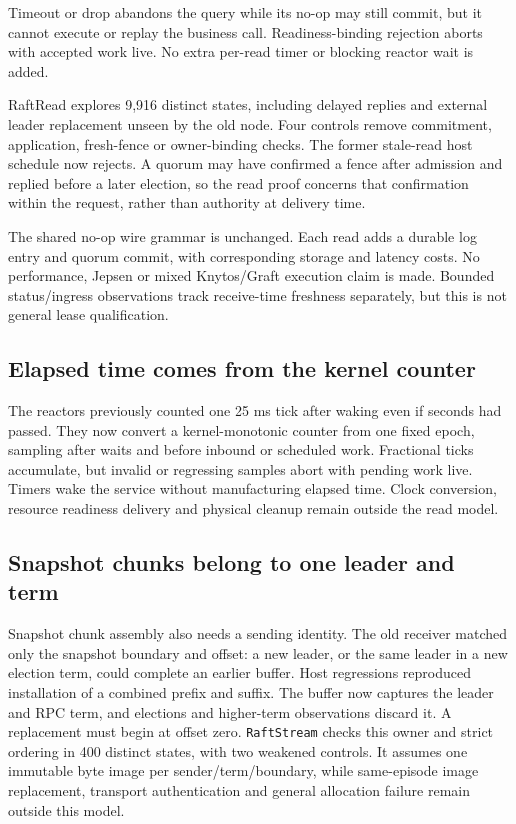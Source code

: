 Timeout or drop abandons the query while its no-op may still commit, but it cannot
execute or replay the business call. Readiness-binding rejection aborts with
accepted work live. No extra per-read timer or blocking reactor wait is added.

RaftRead explores 9,916 distinct states, including delayed
replies and external leader replacement unseen by the old node. Four controls
remove commitment, application, fresh-fence or owner-binding checks. The former
stale-read host schedule now rejects. A quorum may have confirmed a fence after
admission and replied before a later election, so the read proof concerns that
confirmation within the request, rather than authority at delivery time.

The shared no-op wire grammar is unchanged. Each read adds a durable log entry
and quorum commit, with corresponding storage and latency costs. No performance,
Jepsen or mixed Knytos/Graft execution claim is made. Bounded status/ingress
observations track receive-time freshness separately, but this is not general lease
qualification.

\subsection{Elapsed time comes from the kernel counter}

The reactors previously counted one 25 ms tick after waking even if seconds had
passed. They now convert a kernel-monotonic counter from one fixed epoch,
sampling after waits and before inbound or scheduled work. Fractional ticks
accumulate, but invalid or regressing samples abort with pending work live. Timers
wake the service without manufacturing elapsed time. Clock conversion, resource
readiness delivery and physical cleanup remain outside the read model.

\subsection{Snapshot chunks belong to one leader and term}

Snapshot chunk assembly also needs a sending identity. The old receiver matched
only the snapshot boundary and offset: a new leader, or the same leader in a new
election term, could complete an earlier buffer. Host regressions reproduced
installation of a combined prefix and suffix. The buffer now captures the leader
and RPC term, and elections and higher-term observations discard it. A replacement
must begin at offset zero. \texttt{RaftStream} checks this owner and
strict ordering in 400 distinct states, with two weakened controls. It assumes
one immutable byte image per sender/term/boundary, while same-episode image replacement,
transport authentication and general allocation failure remain outside this model.


